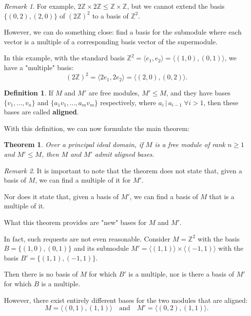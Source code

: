 \documentclass{article}
\newif\ifusemulticols
\newcommand\newterm[1]{\textbf{#1}}
\theoremstyle{definition}
\newtheorem{deff}{Definition}
\theoremstyle{remark}
\newtheorem*{note}{Remark}
\theoremstyle{plain}
\newtheorem{theorem}{Theorem}
\theoremstyle{plain}
\newenvironment{mymulticols}
    { \ifusemulticols \begin{multicols}{2} \fi }
    { \ifusemulticols \end{multicols} \fi }
\newcommand{\Z}{\mathbb{Z}}
\begin{document}
\begin{mymulticols}
\begin{note}
    For example, $2\Z \times 2\Z \le \Z \times \Z$, but we cannot extend the basis $\{(0, 2), (2,
    0)\}$ of $(2\Z)^2$ to a basis of $\Z^2$.

    However, we can do something close: find a basis for the submodule where each vector is a
    multiple of a corresponding basis vector of the supermodule.

    In this example, with the standard basis $\Z^2 = \langle e_1, e_2 \rangle = \langle (1,0), (0,1)
    \rangle$, we have a "multiple" basis:
    $$(2\Z)^2 = \langle 2e_1, 2e_2 \rangle = \langle (2,0), (0,2) \rangle.$$
\end{note}

\begin{deff}
    If $M$ and $M'$ are free modules, $M' \le M$, and they have bases $\{v_1, \ldots, v_n\}$ and
    $\{a_1 v_1, \ldots, a_m v_m\}$ respectively, where $a_i \,|\, a_{i-1} \; \forall i > 1$, then
    these bases are called \newterm{aligned}.
\end{deff}

With this definition, we can now formulate the main theorem:

\begin{theorem}
    \label{prop:aligned_bases}
    Over a principal ideal domain, if $M$ is a free module of rank $n \geq 1$ and $M' \le M$, then
    $M$ and $M'$ admit aligned bases.
\end{theorem}

\begin{note}
    It is important to note that the theorem does not state that, given a basis of $M$, we can find
    a multiple of it for $M'$.

    Nor does it state that, given a basis of $M'$, we can find a basis of $M$ that is a multiple of it.

    What this theorem provides are "new" bases for $M$ and $M'$.

    In fact, such requests are not even reasonable. Consider $M = \Z^2$ with the basis $B = \{(1,0),
    (0,1)\}$ and its submodule $M' = \langle (1,1) \rangle \times \langle (-1, 1) \rangle$ with the
    basis $B' = \{(1,1), (-1,1)\}$.

    Then there is no basis of $M$ for which $B'$ is a multiple, nor is there a basis of $M'$ for
    which $B$ is a multiple.

    However, there exist entirely different bases for the two modules that are aligned:
    $$M = \langle (0,1), (1,1) \rangle \quad \text{and} \quad M' = \langle (0,2), (1,1) \rangle.$$
\end{note}


\end{mymulticols}
\end{document}
